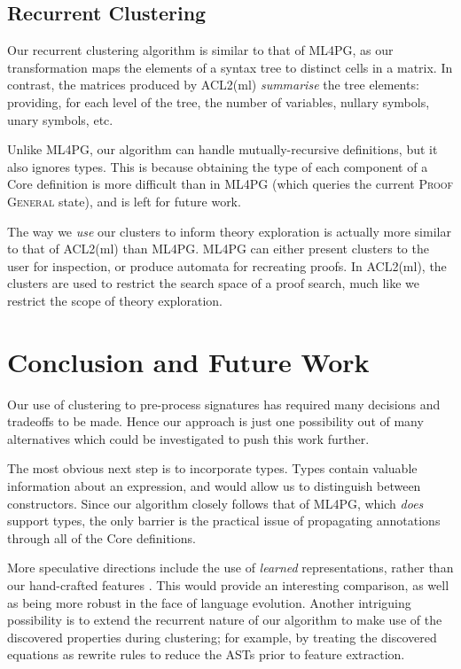 \subsection{Recurrent Clustering}
\label{sec:clusteringexpressions}

Our recurrent clustering algorithm is similar to that of ML4PG, as our
transformation maps the elements of a syntax tree to distinct cells in a
matrix. In contrast, the matrices produced by ACL2(ml) \emph{summarise} the tree
elements: providing, for each level of the tree, the number of variables,
nullary symbols, unary symbols, etc.

Unlike ML4PG, our algorithm can handle mutually-recursive definitions, but it
also ignores types. This is because obtaining the type of each component of a
Core definition is more difficult than in ML4PG (which queries the current
\textsc{Proof General} state), and is left for future work.

The way we \emph{use} our clusters to inform theory exploration is actually more
similar to that of ACL2(ml) than ML4PG. ML4PG can either present clusters to the
user for inspection, or produce automata for recreating proofs. In ACL2(ml), the
clusters are used to restrict the search space of a proof search, much like we
restrict the scope of theory exploration.

\section{Conclusion and Future Work}
\label{sec:conclusion}

Our use of clustering to pre-process \quickspec{} signatures has required many
decisions and tradeoffs to be made. Hence our approach is just one possibility
out of many alternatives which could be investigated to push this work further.

The most obvious next step is to incorporate types. Types contain valuable
information about an expression, and would allow us to distinguish between
constructors. Since our algorithm closely follows that of ML4PG, which
\emph{does} support types, the only barrier is the practical issue of
propagating annotations through all of the Core definitions.

More speculative directions include the use of \emph{learned} representations,
rather than our hand-crafted features \cite{bengio2013representation}. This
would provide an interesting comparison, as well as being more robust in the
face of language evolution. Another intriguing possibility is to extend the
recurrent nature of our algorithm to make use of the discovered properties
during clustering; for example, by treating the discovered equations as rewrite
rules to reduce the ASTs prior to feature extraction.
